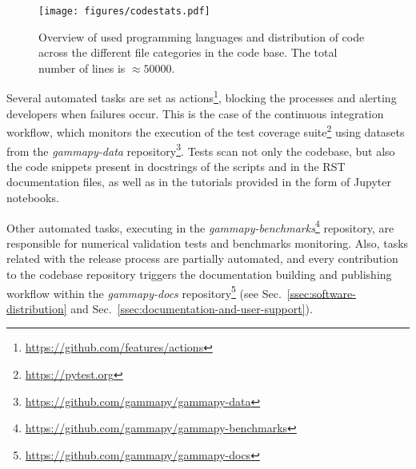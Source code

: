 \documentclass[longauth]{aa}
\begin{document}

\begin{figure}[t]
	\centering
	\texttt{[image: figures/codestats.pdf]}
	\caption{
		Overview of used programming languages and distribution of code across the different file
        categories in the \gammapy code base. The total number of lines is $\approx 50 000$.
    }
	\label{fig:codestats:lang}
\end{figure}

Several automated tasks are set as \github
actions\footnote{\url{https://github.com/features/actions}}, blocking the
processes and alerting developers when failures occur. This is the case of the
continuous integration workflow, which monitors the execution of the test coverage
suite\footnote{\url{https://pytest.org}} using datasets from the
\textit{gammapy-data} repository\footnote{\url{https://github.com/gammapy/gammapy-data}}.
Tests scan not only the codebase, but also the
code snippets present in docstrings of the scripts and in the RST documentation
files, as well as in the tutorials provided in the form of Jupyter notebooks.

Other automated tasks, executing in the
\textit{gammapy-benchmarks}\footnote{\url{https://github.com/gammapy/gammapy-benchmarks}} repository,
are responsible for numerical validation tests and benchmarks monitoring. Also,
tasks related with the release process are partially automated, and every
contribution to the codebase repository triggers the documentation building and
publishing workflow within the
\textit{gammapy-docs} repository\footnote{\url{https://github.com/gammapy/gammapy-docs}}
(see Sec.~\ref{ssec:software-distribution} and Sec.~\ref{ssec:documentation-and-user-support}).
\end{document}
